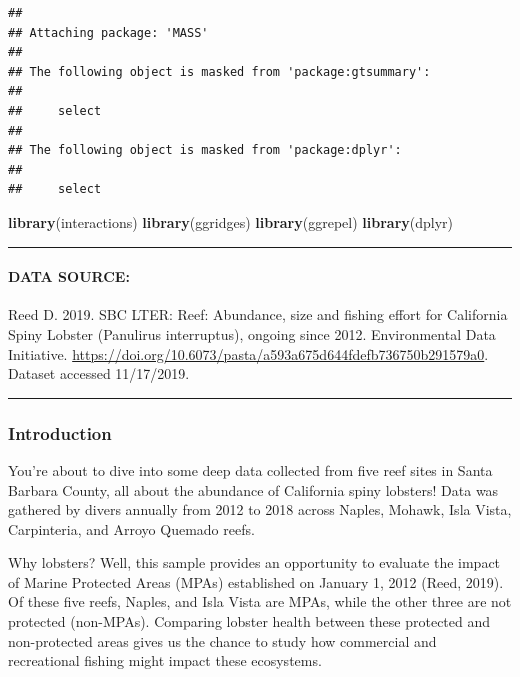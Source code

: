 \documentclass[
]{article}
\newenvironment{Shaded}{\begin{snugshade}}{\end{snugshade}}
\newcommand{\FunctionTok}[1]{\textcolor[rgb]{0.13,0.29,0.53}{\textbf{#1}}}
\newcommand{\NormalTok}[1]{#1}
\begin{document}
\begin{verbatim}
## 
## Attaching package: 'MASS'
## 
## The following object is masked from 'package:gtsummary':
## 
##     select
## 
## The following object is masked from 'package:dplyr':
## 
##     select
\end{verbatim}

\begin{Shaded}
\begin{Highlighting}[]
\FunctionTok{library}\NormalTok{(interactions) }
\FunctionTok{library}\NormalTok{(ggridges)}
\FunctionTok{library}\NormalTok{(ggrepel)}
\FunctionTok{library}\NormalTok{(dplyr)}
\end{Highlighting}
\end{Shaded}

\begin{center}\rule{0.5\linewidth}{0.5pt}\end{center}

\paragraph{DATA SOURCE:}\label{data-source}

Reed D. 2019. SBC LTER: Reef: Abundance, size and fishing effort for
California Spiny Lobster (Panulirus interruptus), ongoing since 2012.
Environmental Data Initiative.
\url{https://doi.org/10.6073/pasta/a593a675d644fdefb736750b291579a0}.
Dataset accessed 11/17/2019.

\begin{center}\rule{0.5\linewidth}{0.5pt}\end{center}

\subsubsection{\texorpdfstring{\textbf{Introduction}}{Introduction}}\label{introduction}

You're about to dive into some deep data collected from five reef sites
in Santa Barbara County, all about the abundance of California spiny
lobsters! Data was gathered by divers annually from 2012 to 2018 across
Naples, Mohawk, Isla Vista, Carpinteria, and Arroyo Quemado reefs.

Why lobsters? Well, this sample provides an opportunity to evaluate the
impact of Marine Protected Areas (MPAs) established on January 1, 2012
(Reed, 2019). Of these five reefs, Naples, and Isla Vista are MPAs,
while the other three are not protected (non-MPAs). Comparing lobster
health between these protected and non-protected areas gives us the
chance to study how commercial and recreational fishing might impact
these ecosystems.
\end{document}
